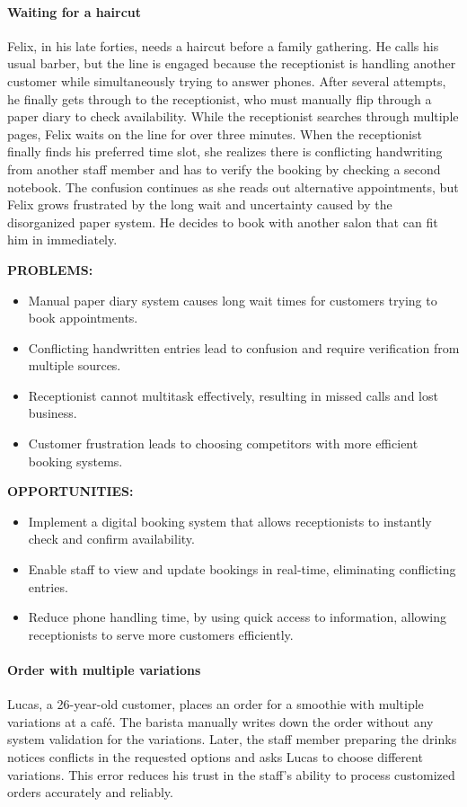 \documentclass[]{VUMIFTemplateClass}
\newcommand{\subsubsubsection}[1]{\paragraph{#1}}
\begin{document}
\newpage


\subsubsubsection{Waiting for a haircut}

Felix, in his late forties, needs a haircut before a family gathering. He calls
his usual barber, but the line is engaged because the receptionist is handling
another customer while simultaneously trying to answer phones. After several
attempts, he finally gets through to the receptionist, who must manually flip
through a paper diary to check availability. While the receptionist searches
through multiple pages, Felix waits on the line for over three minutes. When
the receptionist finally finds his preferred time slot, she realizes there is
conflicting handwriting from another staff member and has to verify the booking
by checking a second notebook. The confusion continues as she reads out
alternative appointments, but Felix grows frustrated by the long wait and
uncertainty caused by the disorganized paper system. He decides to book with
another salon that can fit him in immediately.

\textbf{PROBLEMS:}
\begin{itemize}
    \item Manual paper diary system causes long wait times for customers trying to book appointments.
    \item Conflicting handwritten entries lead to confusion and require verification from multiple sources.
    \item Receptionist cannot multitask effectively, resulting in missed calls and lost business.
    \item Customer frustration leads to choosing competitors with more efficient booking systems.
\end{itemize}
\textbf{OPPORTUNITIES:}
\begin{itemize}
    \item Implement a digital booking system that allows receptionists to instantly check and confirm availability.
    \item Enable staff to view and update bookings in real-time, eliminating conflicting entries.
    \item Reduce phone handling time, by using quick access to information, allowing receptionists to serve more customers efficiently.
\end{itemize}

\subsubsubsection{Order with multiple variations}

Lucas, a 26-year-old customer, places an order for a smoothie with multiple
variations at a café. The barista manually writes down the order without any
system validation for the variations. Later, the staff member preparing the
drinks notices conflicts in the requested options and asks Lucas to choose
different variations. This error reduces his trust in the staff’s ability to
process customized orders accurately and reliably.
\end{document}
